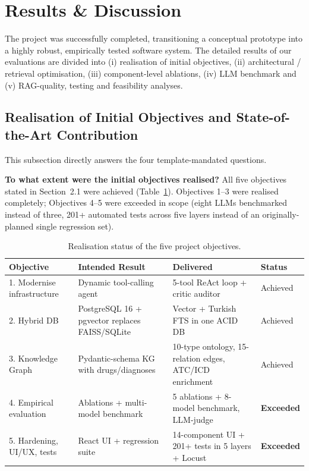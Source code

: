 \documentclass[11pt, a4paper]{article}
\begin{document}
\section{Results \& Discussion}

The project was successfully completed, transitioning a conceptual prototype into a highly robust, empirically tested software system. The detailed results of our evaluations are divided into (i) realisation of initial objectives, (ii) architectural / retrieval optimisation, (iii) component-level ablations, (iv) LLM benchmark and (v) RAG-quality, testing and feasibility analyses.

\subsection{Realisation of Initial Objectives and State-of-the-Art Contribution}

This subsection directly answers the four template-mandated questions.

\textbf{To what extent were the initial objectives realised?} All five objectives stated in Section~2.1 were achieved (Table~\ref{tab:objective-realisation}). Objectives 1--3 were realised completely; Objectives 4--5 were exceeded in scope (eight LLMs benchmarked instead of three, 201+ automated tests across five layers instead of an originally-planned single regression set).

\begin{table}[H]
    \centering
    \footnotesize
    \caption{Realisation status of the five project objectives.}
    \label{tab:objective-realisation}
    \begin{tabular}{p{3.4cm}p{4.0cm}p{5.0cm}p{1.6cm}}
        \toprule
        \textbf{Objective} & \textbf{Intended Result} & \textbf{Delivered} & \textbf{Status}\\
        \midrule
        1. Modernise infrastructure & Dynamic tool-calling agent & 5-tool ReAct loop + critic auditor & Achieved \\
        2. Hybrid DB & PostgreSQL 16 + pgvector replaces FAISS/SQLite & Vector + Turkish FTS in one ACID DB & Achieved \\
        3. Knowledge Graph & Pydantic-schema KG with drugs/diagnoses & 10-type ontology, 15-relation edges, ATC/ICD enrichment & Achieved \\
        4. Empirical evaluation & Ablations + multi-model benchmark & 5 ablations + 8-model benchmark, LLM-judge & \textbf{Exceeded} \\
        5. Hardening, UI/UX, tests & React UI + regression suite & 14-component UI + 201+ tests in 5 layers + Locust & \textbf{Exceeded} \\
        \bottomrule
    \end{tabular}
\end{table}
\end{document}
